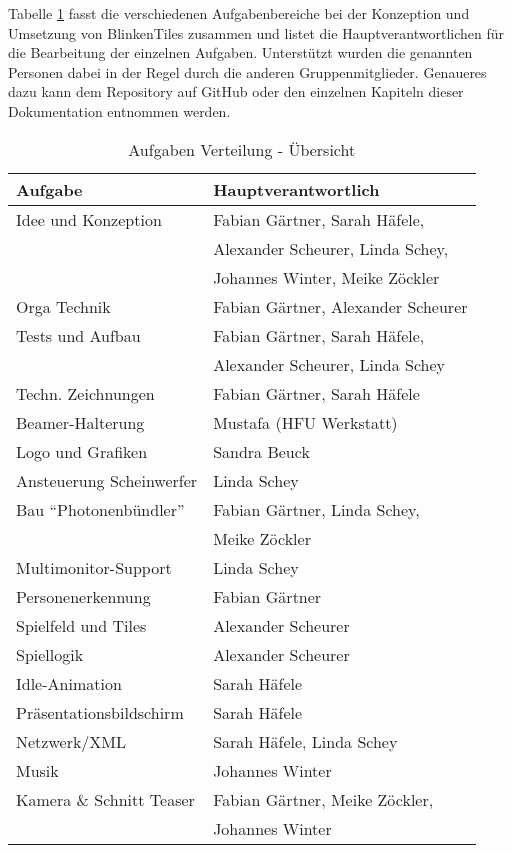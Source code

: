 
Tabelle \ref{tab:aufgaben} fasst die verschiedenen Aufgabenbereiche bei der Konzeption und Umsetzung von BlinkenTiles zusammen und listet die Hauptverantwortlichen für die Bearbeitung der einzelnen Aufgaben. Unterstützt wurden die genannten Personen dabei in der Regel durch die anderen Gruppenmitglieder. Genaueres dazu kann dem Repository auf GitHub oder den einzelnen Kapiteln dieser Dokumentation entnommen werden.

\vspace{0.8em}

\begin{table}[hc]
\begin{center}
\begin{tabular}[hc]{l|l}
\textbf{Aufgabe} & \textbf{Hauptverantwortlich}\\
\hline
Idee und Konzeption& Fabian Gärtner, Sarah Häfele,\\
&Alexander Scheurer, Linda Schey,\\
&Johannes Winter, Meike Zöckler\\\hline
Orga Technik& Fabian Gärtner, Alexander Scheurer\\\hline
Tests und Aufbau& Fabian Gärtner, Sarah Häfele,\\
&Alexander Scheurer, Linda Schey\\\hline
Techn. Zeichnungen& Fabian Gärtner, Sarah Häfele\\\hline
Beamer-Halterung& Mustafa (HFU Werkstatt)\\\hline
Logo und Grafiken& Sandra Beuck\\\hline
Ansteuerung Scheinwerfer&Linda Schey\\\hline
Bau \enquote{Photonenbündler}&Fabian Gärtner, Linda Schey, \\&Meike Zöckler\\\hline
Multimonitor-Support& Linda Schey\\\hline
Personenerkennung& Fabian Gärtner\\\hline
Spielfeld und Tiles& Alexander Scheurer\\\hline
Spiellogik& Alexander Scheurer\\\hline
Idle-Animation& Sarah Häfele\\\hline
Präsentationsbildschirm& Sarah Häfele\\\hline
Netzwerk/XML& Sarah Häfele, Linda Schey\\\hline
Musik& Johannes Winter\\\hline
Kamera \& Schnitt Teaser&Fabian Gärtner, Meike Zöckler,\\&Johannes Winter\\
\hline
\end{tabular}
\caption{Aufgaben Verteilung - Übersicht}
\label{tab:aufgaben}
\end{center}
\end{table}
